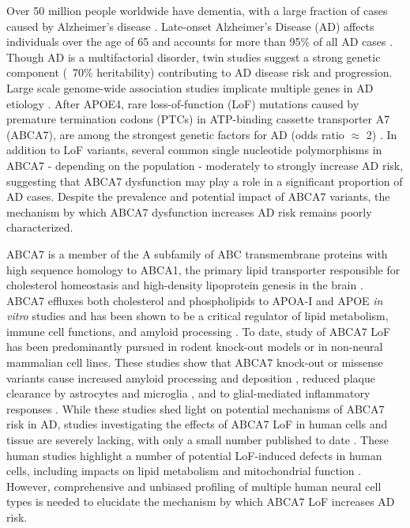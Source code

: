 Over 50 million people worldwide have dementia, with a large fraction of cases caused by Alzheimer’s disease \cite{WHO2023Dementia}. Late-onset Alzheimer’s Disease (AD) affects individuals over the age of 65 and accounts for more than 95\% of all AD cases \cite{Alzheimers_Association2016-jx}. Though AD is a multifactorial disorder, twin studies suggest a strong genetic component (~70\% heritability) \cite{Karlsson2022-vv} contributing to AD disease risk and progression. Large scale genome-wide association studies implicate multiple genes in AD etiology \cite{Lambert2013-km,Marioni2019-os,Jansen2019-ww,Kunkle2019-yo,Wightman2021-km,Bellenguez2022-ao,Belloy2023-kj}. After APOE4, rare loss-of-function (LoF) mutations caused by premature termination codons (PTCs) in ATP-binding cassette transporter A7 (ABCA7), are among the strongest genetic factors for AD (odds ratio $\approx$ 2) \cite{Steinberg2015-mu,De_Roeck2019-bs,Reitz2013-eo,Bellenguez2022-ao,Holstege2022-vp,Lyssenko2021-gw}. In addition to LoF variants, several common single nucleotide polymorphisms in ABCA7 - depending on the population - moderately \cite{Steinberg2015-mu,De_Roeck2019-bs,Reitz2013-eo,Bellenguez2022-ao,Le_Guennec2016-mr,Hollingworth2011-tr,Naj2011-bs} to strongly \cite{Reitz2013-eo} increase AD risk, suggesting that ABCA7 dysfunction may play a role in a significant proportion of AD cases. Despite the prevalence and potential impact of ABCA7 variants, the mechanism by which ABCA7 dysfunction increases AD risk remains poorly characterized. 

ABCA7 is a member of the A subfamily of ABC transmembrane proteins \cite{Kim2008-zi} with high sequence homology to ABCA1, the primary lipid transporter responsible for cholesterol homeostasis and high-density lipoprotein genesis in the brain \cite{Koldamova2014-kd}. ABCA7 effluxes both cholesterol and phospholipids to APOA-I and APOE \textit{in vitro} studies \cite{Abe-Dohmae2004-wb,Wang2003-wh,Tomioka2017-nv,Picataggi2022-yp,Quazi2013-pe,Fang2025} and has been shown to be a critical regulator of lipid metabolism, immune cell functions, and amyloid processing \cite{Aikawa2018-ek,Tanaka2011-zo,Duchateau2023-ji,Kawatani2023-vf,Tayran2024-bo}. To date, study of ABCA7 LoF has been predominantly pursued in rodent knock-out models or in non-neural mammalian cell lines. These studies show that ABCA7 knock-out or missense variants  cause increased amyloid processing and deposition \cite{Satoh2015-yu,Sakae2016-uy,Chan2008-qu,Bamji-Mirza2018-xt}, reduced plaque clearance by astrocytes and microglia \cite{Kim2013-sv,Fu2016-qe}, and to glial-mediated inflammatory responses \cite{Aikawa2019-hv,Aikawa2021-vz}.  While these studies shed light on potential mechanisms of ABCA7 risk in AD, studies investigating the effects of ABCA7 LoF in human cells and tissue are severely lacking, with only a small number published to date \cite{Kawatani2023-vf,Allen2017-vw,Liu2021-zh,Bamji-Mirza2018-xt}.  These human studies highlight a number of potential LoF-induced defects in human cells, including impacts on lipid metabolism and mitochondrial function \cite{Kawatani2023-vf}. However, comprehensive and unbiased profiling of multiple human neural cell types is needed to elucidate the mechanism by which ABCA7 LoF increases AD risk.

